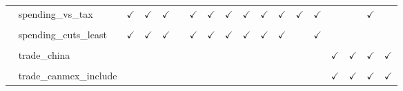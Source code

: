 \documentclass[
  12pt]{article}
\begin{document}
\begin{table}[H]
{\begin{tabular}{lcccccccccccccccc}
$\hspace{10pt}$spending\_vs\_tax & $\checkmark$ & $\checkmark$ & $\checkmark$ &  & $\checkmark$ & $\checkmark$ & $\checkmark$ & $\checkmark$ & $\checkmark$ & $\checkmark$ & $\checkmark$ & $\checkmark$ &  &  & $\checkmark$ & \\
\cellcolor{gray!6}{$\hspace{10pt}$spending\_cuts\_most} & \cellcolor{gray!6}{$\checkmark$} & \cellcolor{gray!6}{$\checkmark$} & \cellcolor{gray!6}{$\checkmark$} & \cellcolor{gray!6}{} & \cellcolor{gray!6}{$\checkmark$} & \cellcolor{gray!6}{$\checkmark$} & \cellcolor{gray!6}{$\checkmark$} & \cellcolor{gray!6}{$\checkmark$} & \cellcolor{gray!6}{$\checkmark$} & \cellcolor{gray!6}{$\checkmark$} & \cellcolor{gray!6}{} & \cellcolor{gray!6}{$\checkmark$} & \cellcolor{gray!6}{} & \cellcolor{gray!6}{} & \cellcolor{gray!6}{} & \cellcolor{gray!6}{}\\
$\hspace{10pt}$spending\_cuts\_least & $\checkmark$ & $\checkmark$ & $\checkmark$ &  & $\checkmark$ & $\checkmark$ & $\checkmark$ & $\checkmark$ & $\checkmark$ & $\checkmark$ &  & $\checkmark$ &  &  &  & \\
\cellcolor{gray!6}{$\textbf{Trade}$} & \cellcolor{gray!6}{} & \cellcolor{gray!6}{} & \cellcolor{gray!6}{} & \cellcolor{gray!6}{} & \cellcolor{gray!6}{} & \cellcolor{gray!6}{} & \cellcolor{gray!6}{} & \cellcolor{gray!6}{} & \cellcolor{gray!6}{} & \cellcolor{gray!6}{} & \cellcolor{gray!6}{} & \cellcolor{gray!6}{} & \cellcolor{gray!6}{} & \cellcolor{gray!6}{} & \cellcolor{gray!6}{} & \cellcolor{gray!6}{}\\
$\hspace{10pt}$trade\_china &  &  &  &  &  &  &  &  &  &  &  &  & $\checkmark$ & $\checkmark$ & $\checkmark$ & $\checkmark$\\
\cellcolor{gray!6}{$\hspace{10pt}$trade\_canmex\_except} & \cellcolor{gray!6}{} & \cellcolor{gray!6}{} & \cellcolor{gray!6}{} & \cellcolor{gray!6}{} & \cellcolor{gray!6}{} & \cellcolor{gray!6}{} & \cellcolor{gray!6}{} & \cellcolor{gray!6}{} & \cellcolor{gray!6}{} & \cellcolor{gray!6}{} & \cellcolor{gray!6}{} & \cellcolor{gray!6}{} & \cellcolor{gray!6}{$\checkmark$} & \cellcolor{gray!6}{$\checkmark$} & \cellcolor{gray!6}{$\checkmark$} & \cellcolor{gray!6}{}\\
$\hspace{10pt}$trade\_canmex\_include &  &  &  &  &  &  &  &  &  &  &  &  & $\checkmark$ & $\checkmark$ & $\checkmark$ & $\checkmark$\\

\end{tabular}}
\end{table}
\end{document}
